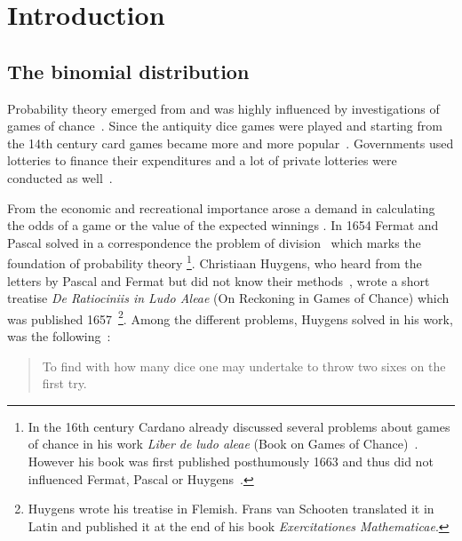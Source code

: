 \chapter{Introduction}

\section{The binomial distribution}


 Probability theory emerged from and was highly influenced by investigations of games of chance~\cite[p. 4]{hald1}. Since the antiquity dice games were played and starting from the 14th century card games became more and more popular~\cite[pp. 33-34]{hald1}. Governments used lotteries to finance their expenditures and a lot of private lotteries were conducted as well~\cite[p. 34]{hald1}.


From the economic and recreational importance arose a demand in calculating the odds of a game or the value of the expected winnings . In 1654 Fermat and Pascal solved in a correspondence the problem of division~\cite[pp. 42-80]{hald1} which marks the foundation of probability theory \footnote{In the 16th century Cardano already discussed several problems about games of chance in his work \emph{Liber de ludo aleae} (Book on Games of Chance)~\cite[pp. 33-41]{hald1}. However his book was first published posthumously 1663 and thus did not influenced Fermat, Pascal or Huygens~\cite[p. vii]{bernoulli}.}. Christiaan Huygens, who heard from the letters by Pascal and Fermat but did not know their methods~\cite[p. vii]{bernoulli}, wrote a short treatise \emph{De Ratiociniis in Ludo Aleae} (On Reckoning in Games of Chance) which was published 1657~\cite[p. vii]{bernoulli}\footnote{Huygens wrote his treatise in Flemish. Frans van Schooten translated it in Latin and published it at the end of his book \emph{Exercitationes Mathematicae}.}. Among the different problems, Huygens solved in his work, was the following~\cite[p. 163]{bernoulli}:

\begin{quotation}
  To find with how many dice one may undertake to throw two sixes on the first try.
\end{quotation}

